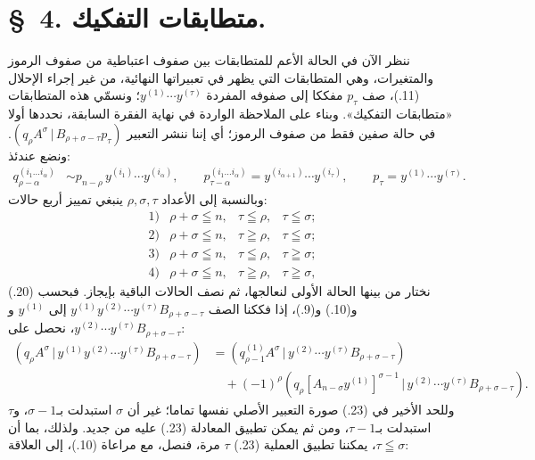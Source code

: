 \documentclass[11pt]{article}
\providecommand{\pair}[2]{(#1\,|\,#2)}
\begin{document}
\section*{\S\ 4. متطابقات التفكيك.}
ننظر الآن في الحالة الأعم للمتطابقات بين صفوف اعتباطية من صفوف الرموز والمتغيرات، وهي المتطابقات التي يظهر في تعبيراتها النهائية، من غير إجراء الإحلال (11.)، صف $p_\tau$ مفككا إلى صفوفه المفردة $y^{(1)}\cdots y^{(\tau)}$؛ ونسمّي هذه المتطابقات «متطابقات التفكيك». وبناء على الملاحظة الواردة في نهاية الفقرة السابقة، نحددها أولا في حالة صفين فقط من صفوف الرموز؛ أي إننا ننشر التعبير $\pair{q_\rho A^\sigma}{B_{\rho+\sigma-\tau}p_\tau}$. ونضع عندئذ:
\begin{equation}
\begin{aligned}
q_{\rho-\alpha}^{(i_1\ldots i_\alpha)}&\sim p_{n-\rho}\,y^{(i_1)}\cdots y^{(i_\alpha)},\qquad
p_{\tau-\alpha}^{(i_1\ldots i_\alpha)}=y^{(i_{\alpha+1})}\cdots y^{(i_\tau)},\qquad
p_\tau=y^{(1)}\cdots y^{(\tau)}.
\end{aligned}
\tag{22}
\end{equation}
وبالنسبة إلى الأعداد $\rho,\sigma,\tau$ ينبغي تمييز أربع حالات:
\[
\begin{array}{llll}
1)&\rho+\sigma\leqq n,& \tau\leqq\rho,& \tau\leqq\sigma;\\[2pt]
2)&\rho+\sigma\leqq n,& \tau\geqq\rho,& \tau\leqq\sigma;\\[2pt]
3)&\rho+\sigma\leqq n,& \tau\leqq\rho,& \tau\geqq\sigma;\\[2pt]
4)&\rho+\sigma\leqq n,& \tau\geqq\rho,& \tau\geqq\sigma,
\end{array}
\]
نختار من بينها الحالة الأولى لنعالجها، ثم نصف الحالات الباقية بإيجاز. فبحسب (20.) و(10.) و(9.)، إذا فككنا الصف $y^{(1)}y^{(2)}\cdots y^{(\tau)}B_{\rho+\sigma-\tau}$ إلى $y^{(1)}$ و$y^{(2)}\cdots y^{(\tau)}B_{\rho+\sigma-\tau}$، نحصل على:
\begin{equation}
\begin{aligned}
\pair{q_\rho A^\sigma}{y^{(1)}y^{(2)}\cdots y^{(\tau)}B_{\rho+\sigma-\tau}}
&=\pair{q_{\rho-1}^{(1)}A^\sigma}{y^{(2)}\cdots y^{(\tau)}B_{\rho+\sigma-\tau}}\\
&\quad+(-1)^\rho\pair{q_\rho[A_{n-\sigma}y^{(1)}]^{\sigma-1}}{y^{(2)}\cdots y^{(\tau)}B_{\rho+\sigma-\tau}}.
\end{aligned}
\tag{23}
\end{equation}
وللحد الأخير في (23.) صورة التعبير الأصلي نفسها تماما؛ غير أن $\sigma$ استبدلت بـ$\sigma-1$، و$\tau$ استبدلت بـ$\tau-1$، ومن ثم يمكن تطبيق المعادلة (23.) عليه من جديد. ولذلك، بما أن $\tau\leqq\sigma$، يمكننا تطبيق العملية (23.) $\tau$ مرة، فنصل، مع مراعاة (10.)، إلى العلاقة:
\end{document}
